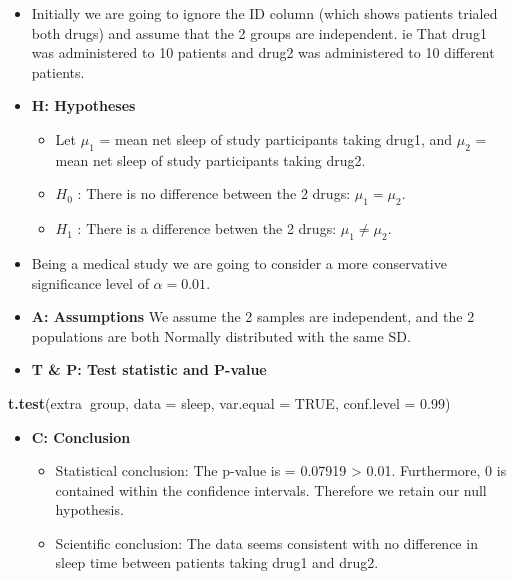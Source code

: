 \documentclass[]{article}
\newenvironment{Shaded}{\begin{snugshade}}{\end{snugshade}}
\newcommand{\DataTypeTok}[1]{\textcolor[rgb]{0.13,0.29,0.53}{#1}}
\newcommand{\FloatTok}[1]{\textcolor[rgb]{0.00,0.00,0.81}{#1}}
\newcommand{\KeywordTok}[1]{\textcolor[rgb]{0.13,0.29,0.53}{\textbf{#1}}}
\newcommand{\NormalTok}[1]{#1}
\newcommand{\OperatorTok}[1]{\textcolor[rgb]{0.81,0.36,0.00}{\textbf{#1}}}
\newcommand{\OtherTok}[1]{\textcolor[rgb]{0.56,0.35,0.01}{#1}}
\providecommand{\tightlist}{%
  \setlength{\itemsep}{0pt}\setlength{\parskip}{0pt}}
\begin{document}
\begin{itemize}
\item
  Initially we are going to ignore the ID column (which shows patients trialed both drugs) and assume that the 2 groups are independent. ie That drug1 was administered to 10 patients and drug2 was administered to 10 different patients.
\item
  \textbf{H: Hypotheses}

  \begin{itemize}
  \item
    Let \(\mu_1\) = mean net sleep of study participants taking drug1, and \(\mu_2\) = mean net sleep of study participants taking drug2.
  \item
    \(H_{0}\) : There is no difference between the 2 drugs: \(\mu_1=\mu_2\).
  \item
    \(H_{1}\) : There is a difference betwen the 2 drugs: \(\mu_1 \neq \mu_2\).
  \end{itemize}
\item
  Being a medical study we are going to consider a more conservative significance level of \(\alpha = 0.01\).
\item
  \textbf{A: Assumptions} We assume the 2 samples are independent, and the 2 populations are both Normally distributed with the same SD.
\item
  \textbf{T \& P: Test statistic and P-value}
\end{itemize}

\begin{Shaded}
\begin{Highlighting}[]
\KeywordTok{t.test}\NormalTok{(extra}\OperatorTok{~}\NormalTok{group, }\DataTypeTok{data =}\NormalTok{ sleep, }\DataTypeTok{var.equal =} \OtherTok{TRUE}\NormalTok{, }\DataTypeTok{conf.level =} \FloatTok{0.99}\NormalTok{)}
\end{Highlighting}
\end{Shaded}

\begin{itemize}
\tightlist
\item
  \textbf{C: Conclusion}

  \begin{itemize}
  \item
    Statistical conclusion: The p-value is = 0.07919 \textgreater{} 0.01. Furthermore, 0 is contained within the confidence intervals. Therefore we retain our null hypothesis.
  \item
    Scientific conclusion: The data seems consistent with no difference in sleep time between patients taking drug1 and drug2.
  \end{itemize}
\end{itemize}
\end{document}
